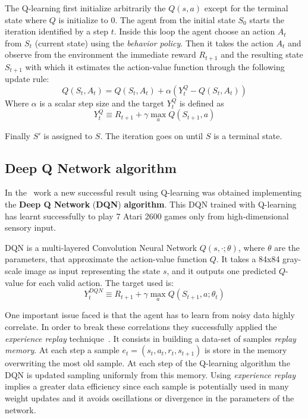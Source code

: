 The Q-learning first initialize arbitrarily the $Q(s,a)$ except for the terminal state where $Q$ is initialize to 0.
The agent from the initial state $S_0$ starts the iteration identified by a step $t$. Inside this loop the agent choose an action $A_t$ from $S_t$ (current state) using the \textit{behavior policy}. Then it takes the action $A_t$ and observe from the environment the immediate reward $R_{t+1}$ and the resulting state $S_{t+1}$ with which it estimates the action-value function through the following update rule:
\begin{equation}
	Q(S_t, A_t) = Q(S_t, A_t) + \alpha (Y^Q_t - Q(S_t, A_t))
\end{equation}
Where $\alpha$ is a scalar step size and the target $Y^Q_t$ is defined as
\begin{equation}
	Y^Q_t \equiv R_{t+1} + \gamma \max_{a} Q(S_{t+1}, a)
\end{equation}

Finally $S'$ is assigned to $S$. The iteration goes on until $S$ is a terminal state.

\subsection{Deep Q Network algorithm}
\label{subsec:DQN}

In the~\cite{DBLP:journals/corr/MnihKSGAWR13} work a new successful result using Q-learning was obtained implementing the \textbf{Deep Q Network} (\textbf{DQN}) \textbf{algorithm}. This DQN trained with Q-learning has learnt successfully to play 7 Atari 2600 games only from high-dimensional sensory input.

DQN is a multi-layered Convolution Neural Network $Q(s, \cdotp; \theta)$, where $\theta$ are the parameters, that approximate the action-value function $Q$. It takes a 84x84 gray-scale image as input representing the state $s$, and it outputs one predicted $Q$-value for each valid action. The target used is:
\begin{equation}
Y^{DQN}_t \equiv R_{t+1} + \gamma \max_{a} Q(S_{t+1}, a; \theta_t)
\end{equation}

One important issue faced is that the agent has to learn from noisy data highly correlate. In order to break these correlations they successfully applied the \textit{experience replay} technique~\cite{Lin:1992:RLR:168871}. It consists in building a data-set of samples \textit{replay memory}. At each step a sample $e_t = (s_t, a_t, r_t, s_{t+1})$ is store in the memory overwriting the most old sample. At each step of the Q-learning algorithm the DQN is updated sampling uniformly from this memory. Using \textit{experience replay} implies a greater data efficiency since each sample is potentially used in many weight updates and it avoids oscillations or divergence in the parameters of the network.

